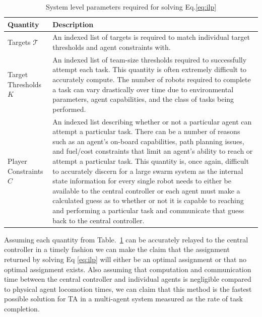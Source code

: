 \documentclass[defaultstyle,12pt]{thesis}
\newcommand{\Ta}{\mathcal{T}} %
\begin{document}
\begin{table}[!ht]
\centering\begin{tabular}{|l|p{}|}
\hline
\textbf{Quantity} & \textbf{Description}\\\hline
Targets $\Ta$ & An indexed list of targets is required to match individual target thresholds and agent constraints with.\\\hline
Target Thresholds $K$ & An indexed list of team-size thresholds required to successfully attempt each task. This quantity is often extremely difficult to accurately compute. The number of robots required to complete a task can vary drastically over time due to environmental parameters, agent capabilities, and the class of tasks being performed.\\\hline
Player Constraints $C$ & An indexed list describing whether or not a particular agent can attempt a particular task. There can be a number of reasons such as an agent's on-board capabilities, path planning issues, and fuel/cost constraints that limit an agent's ability to reach or attempt a particular task. This quantity is, once again, difficult to accurately discern for a large swarm system as the internal state information for every single robot needs to either be available to the central controller or each agent must make a calculated guess as to whether or not it is capable to reaching and performing a particular task and communicate that guess back to the central controller.\\\hline 
\end{tabular}
\centering\caption{System level parameters required for solving Eq.\eqref{eq:ilp}}\label{tab:ilpquants}
\end{table}

Assuming each quantity from Table.~\ref{tab:ilpquants} can be accurately relayed to the central controller in a timely fashion we can make the claim that the assignment returned by solving Eq \eqref{eq:ilp} will either be an optimal assignment or that no optimal assignment exists. Also assuming that computation and communication time between the central controller and individual agents is negligible compared to physical agent locomotion times, we can claim that this method is the fastest possible solution for TA in a multi-agent system measured as the rate of task completion.
\end{document}
